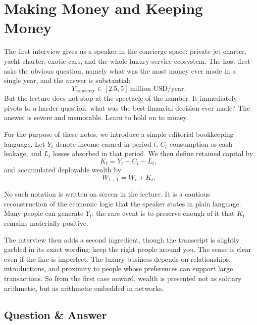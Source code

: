 \section{Making Money and Keeping Money}

The first interview gives us a speaker in the concierge space: private jet charter, yacht charter, exotic cars, and the whole luxury-service ecosystem. The host first asks the obvious question, namely what was the most money ever made in a single year, and the answer is substantial:
\begin{equation}
Y_{\mathrm{concierge}} \in [2.5,5]\ \text{million USD/year}.
\end{equation}
But the lecture does not stop at the spectacle of the number. It immediately pivots to a harder question: what was the best financial decision ever made? The answer is severe and memorable. Learn to hold on to money.

\begin{definition}
For the purpose of these notes, we introduce a simple editorial bookkeeping language. Let \(Y_t\) denote income earned in period \(t\), \(C_t\) consumption or cash leakage, and \(L_t\) losses absorbed in that period. We then define retained capital by
\begin{equation}
K_t = Y_t - C_t - L_t,
\end{equation}
and accumulated deployable wealth by
\begin{equation}
W_{t+1}=W_t+K_t.
\end{equation}
\end{definition}

No such notation is written on screen in the lecture. It is a cautious reconstruction of the economic logic that the speaker states in plain language. Many people can generate \(Y_t\); the rare event is to preserve enough of it that \(K_t\) remains materially positive.

The interview then adds a second ingredient, though the transcript is slightly garbled in its exact wording: keep the right people around you. The sense is clear even if the line is imperfect. The luxury business depends on relationships, introductions, and proximity to people whose preferences can support large transactions. So from the first case onward, wealth is presented not as solitary arithmetic, but as arithmetic embedded in networks.

\subsection{Question \& Answer}

